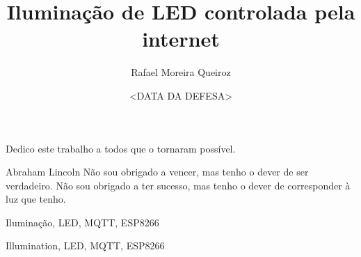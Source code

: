 \documentclass[bsc]{ufpethesis}
\institute{Centro de Tecnologia e Geociências}
\title{Iluminação de LED controlada pela internet}
\date{<DATA DA DEFESA>}
\author{Rafael Moreira Queiroz}
\begin{document}
\frontmatter

\frontpage

\presentationpage

\begin{dedicatory}
    Dedico este trabalho a todos que o tornaram possível.
\end{dedicatory}

\acknowledgements
    

\begin{epigraph}{Abraham Lincoln}
Não sou obrigado a vencer, mas tenho o dever de ser verdadeiro. Não sou obrigado a ter sucesso, mas tenho o dever de corresponder à luz que tenho.
\end{epigraph}

\resumo

\begin{keywords}
    Iluminação, LED, MQTT, ESP8266
\end{keywords}

\abstract

\begin{keywords}
    Illumination, LED, MQTT, ESP8266
\end{keywords}

\tableofcontents

\listoffigures

\listoftables



\mainmatter


% 
% 
\end{document}
